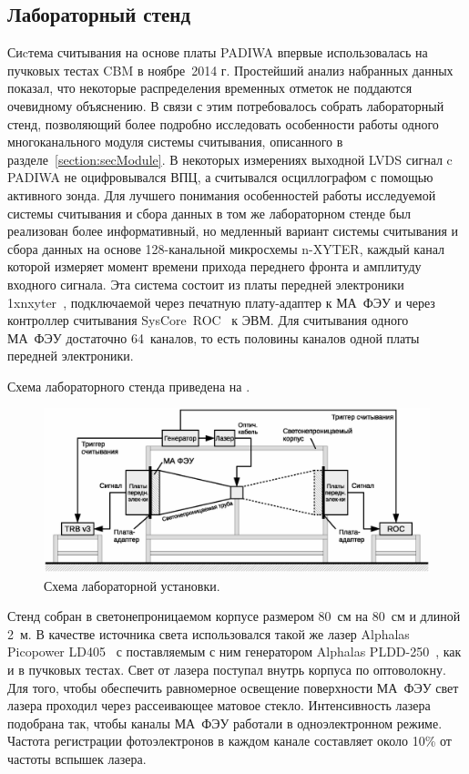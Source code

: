 \subsection{Лабораторный стенд}\label{section:secLabSetup}

Сиcтема считывания на основе платы PADIWA впервые использовалась на пучковых тестах CBM в ноябре~2014 г. Простейший анализ набранных данных показал, что некоторые распределения временных отметок не поддаются очевидному объяснению. В связи с этим потребовалось собрать лабораторный стенд, позволяющий более подробно исследовать особенности работы одного многоканального модуля системы считывания, описанного в разделе~\ref{section:secModule}. В некоторых измерениях выходной LVDS сигнал c PADIWA не оцифровывался ВПЦ, а считывался осциллографом с помощью активного зонда. Для лучшего понимания особенностей работы исследуемой системы считывания и сбора данных в том же лабораторном стенде был реализован более информативный, но медленный вариант системы считывания и сбора данных на основе 128-канальной микросхемы n-XYTER, каждый канал которой измеряет момент времени прихода переднего фронта и амплитуду входного сигнала. Эта система состоит из платы передней электроники 1xnxyter~\cite{}, подключаемой через печатную плату-адаптер к МА~ФЭУ и через контроллер считывания SysCore~ROC~\cite{SYSCORE} к ЭВМ. Для считывания одного МА~ФЭУ достаточно 64~каналов, то есть половины каналов одной платы передней электроники.

Схема лабораторного стенда приведена на .

\begin{figure}
\includegraphics[width=1.0\textwidth]{pictures/12_Lab_setup_3_rus.eps}
\caption{Схема лабораторной установки.}
\label{fig:LabSetup}
\end{figure}

Стенд собран в светонепроницаемом корпусе размером 80~см на 80~см и длиной 2~м. В качестве источника света использовался такой же лазер Alphalas Picopower LD405~\cite{ALPHALAS} с поставляемым с ним генератором Alphalas PLDD-250~\cite{ALPHALAS}, как и в пучковых тестах. Свет от лазера поступал внутрь корпуса по оптоволокну.
Для того, чтобы обеспечить равномерное освещение поверхности МА~ФЭУ свет лазера проходил через рассеивающее матовое стекло.
Интенсивность лазера подобрана так, чтобы каналы МА~ФЭУ работали в одноэлектронном режиме. Частота регистрации фотоэлектронов в каждом канале составляет около 10\% от частоты вспышек лазера.

